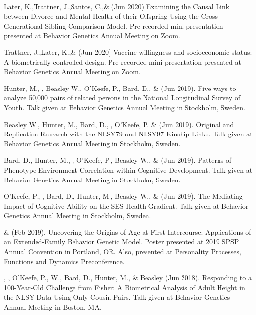 \smallskip\\
%
%
\item Later, K.,\nota Trattner, J.,\nota Santos, C.,\notb \& \meb (Jun 2020) Examining the Causal Link between Divorce and Mental Health of their Offspring Using the Cross-Generational Sibling Comparison Model. Pre-recorded mini presentation presented at Behavior Genetics Annual Meeting on Zoom.
%
\item Trattner, J.,\nota Later, K.,\nota \& \meb (Jun 2020) Vaccine willingness and socioeconomic status: A biometrically controlled design. Pre-recorded mini presentation presented at Behavior Genetics Annual Meeting on Zoom. 
%
\item Hunter, M., \meb, Beasley W., O'Keefe, P.,  Bard, D., \& \Joe (Jun 2019). Five ways to analyze 50,000 pairs of related persons in the National Longitudinal Survey of Youth. Talk given at Behavior Genetics Annual Meeting in Stockholm, Sweden. 

\item Beasley W., Hunter, M., Bard, D., \meb, O'Keefe, P. \&  \Joe (Jun 2019). Original and Replication Research with the NLSY79 and NLSY97 Kinship Links. Talk given at Behavior Genetics Annual Meeting in Stockholm, Sweden. 
%
\item Bard, D., Hunter, M., \meb, O'Keefe, P., Beasley W.,  \&  \Joe (Jun 2019). Patterns of Phenotype-Environment Correlation within Cognitive Development. Talk given at Behavior Genetics Annual Meeting in Stockholm, Sweden. 

\item O'Keefe, P., \meb, Bard, D., Hunter, M.,  Beasley W.,  \&  \Joe (Jun 2019). The Mediating Impact of Cognitive Ability on the SES-Health Gradient. Talk given at Behavior Genetics Annual Meeting in Stockholm, Sweden. 
%
\item \meb \& \Joe (Feb 2019). Uncovering the Origins of Age at First Intercourse: Applications of an Extended-Family Behavior Genetic Model. Poster presented at 2019 SPSP Annual Convention in Portland, OR. Also, presented at Personality Processes, Functions and Dynamics Preconference.
%
\item\Joe, \meb, O'Keefe, P., W., Bard, D., Hunter, M., \& Beasley (Jun 2018). Responding to a 100-Year-Old Challenge from Fisher: A Biometrical Analysis of Adult Height in the NLSY Data Using Only Cousin Pairs. Talk given at Behavior Genetics Annual Meeting in Boston, MA. 

